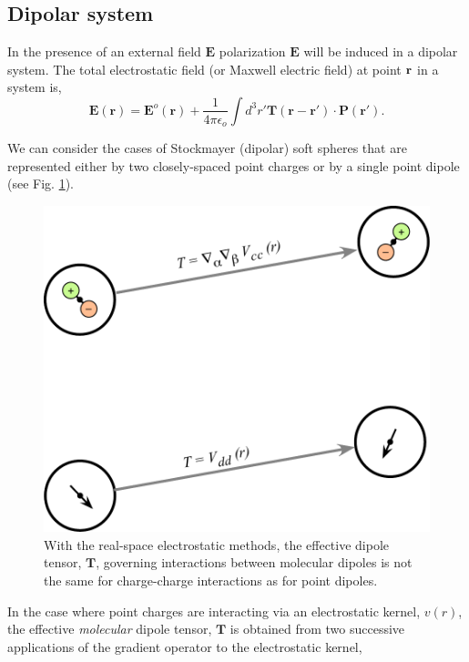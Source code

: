\subsection{Dipolar system}
In the presence of an external field $ \textbf{E}$ polarization $\textbf{E}$ will be induced in a dipolar system. The total electrostatic field (or Maxwell electric field) at point $\bf{r}$ in a system is,\cite{NeumannI83}
\begin{equation}
\textbf{E}(\textbf{r}) = \textbf{E}^o(\textbf{r}) + \frac{1}{4\pi\epsilon_o} \int d^3r' \textbf{T}(\textbf{r}-\textbf{r}')\cdot {\textbf{P}(\textbf{r}')}.
\end{equation}

We can consider the cases of Stockmayer (dipolar) soft spheres that are represented either by two closely-spaced point charges or by a single point dipole (see Fig. \ref{fig:stockmayer}).
\begin{figure}
  \centering
  \includegraphics[width=\linewidth]{DielectricFigure}
\caption{With the real-space electrostatic methods, the effective
  dipole tensor, $\mathbf{T}$, governing interactions between
  molecular dipoles is not the same for charge-charge interactions as
  for point dipoles.}
\label{fig:stockmayer}
\end{figure}
In the case where point charges are interacting via an electrostatic
kernel, $v(r)$, the effective {\it molecular} dipole tensor,
$\mathbf{T}$ is obtained from two successive applications of the
gradient operator to the electrostatic kernel,
